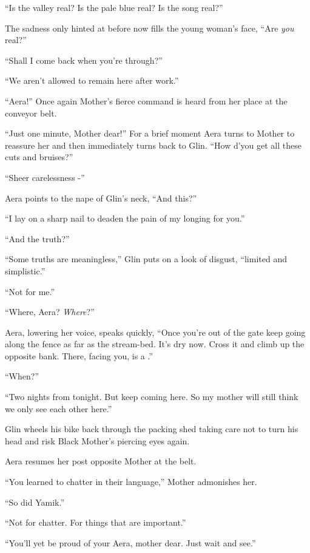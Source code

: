 \documentclass[twoside,11pt]{book}
\begin{document}
``Is the valley real? Is the pale blue real? Is the song real?''

The sadness only hinted at before now fills the young woman's face, ``Are \textit{you}
real?''

``Shall I come back when you're through?''

``We aren't allowed to remain here after work.''

``Aera!'' Once again Mother's fierce command is heard from her place at the conveyor belt.

``Just one minute, Mother dear!'' For a brief moment Aera turns to Mother to
reassure her and then immediately turns back to Glin. ``How d'you get all these cuts and
bruises?''

``Sheer carelessness -''

Aera points to the nape of Glin's neck, ``And this?''

``I lay on a sharp nail to deaden the pain of my longing for you.''

``And the truth?''

``Some truths are meaningless,'' Glin puts on a look of disgust, ``limited and
simplistic.''

``Not for me.''

``Where, Aera? \textit{Where}?''

Aera, lowering her voice, speaks quickly, ``Once you're out of the gate keep going along the fence as far
as the stream-bed. It's dry now. Cross it and climb up the opposite bank. There, facing you, is a .''

``When?''

``Two nights from tonight. But keep coming here. So my mother will still think we only see each other
here.''

Glin wheels his bike back through the packing shed taking care not to turn his head and risk Black Mother's piercing
eyes again.

Aera resumes her post opposite Mother at the belt.

``You learned to chatter in their language,'' Mother admonishes her.

``So did Yamik.''

``Not for chatter. For things that are important.''

``You'll yet be proud of your Aera, mother dear.  Just wait and see.''



\chapter{}
\end{document}
